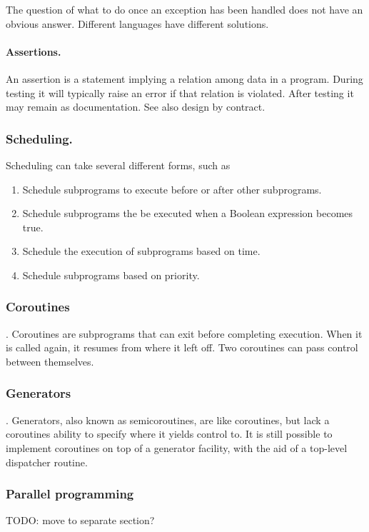 The question of what to do once an exception has been handled does not have an obvious answer. Different languages have different solutions.
\paragraph{Assertions.} An assertion is a statement implying a relation among data in a program. During testing it will typically raise an error if that relation is violated. After testing it may remain as documentation. See also design by contract.

\subsubsection{Scheduling.} Scheduling can take several different forms, such as
\begin{enumerate}
\item Schedule subprograms to execute before or after other subprograms.
\item Schedule subprograms the be executed when a Boolean expression becomes true.
\item Schedule the execution of subprograms based on time.
\item Schedule subprograms based on priority.
\end{enumerate}

\subsubsection{Coroutines}. Coroutines are subprograms that can exit before completing execution. When it is called again, it resumes from where it left off. Two coroutines can pass control between themselves.

\subsubsection{Generators}. Generators, also known as semicoroutines, are like coroutines, but lack a coroutines ability to specify where it yields control to. It is still possible to implement coroutines on top of a generator facility, with the aid of a top-level dispatcher routine.

\subsubsection{Parallel programming}
TODO: move to separate section?
